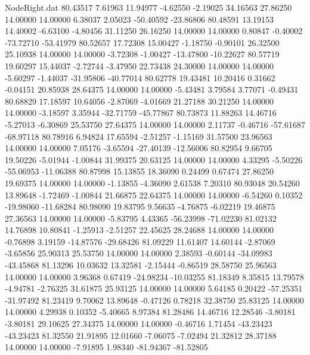 \begin{filecontents}{NodeRight.dat}
  80.43517    7.61963   11.94977    -4.62550   -2.19025   34.16563   27.86250   14.00000   14.00000    6.38037    2.05023  -50.40592  -23.86806
  80.48591   13.19153   14.40002    -6.63100   -4.80456   31.11250   26.16250   14.00000   14.00000    0.80847   -0.40002  -73.72710  -53.41979
  80.52657   17.72308   15.00427    -1.18750   -0.90101   26.32500   25.10938   14.00000   14.00000   -3.72308   -1.00427  -13.47800  -10.22627
  80.57719   19.60297   15.44037    -2.72744   -3.47950   22.73438   24.30000   14.00000   14.00000   -5.60297   -1.44037  -31.95806  -40.77014
  80.62778   19.43481   10.20416     0.31662   -0.04151   20.85938   28.64375   14.00000   14.00000   -5.43481    3.79584    3.77071   -0.49431
  80.68829   17.18597   10.64056    -2.87069   -4.01669   21.27188   30.21250   14.00000   14.00000   -3.18597    3.35944  -32.71759  -45.77867
  80.73873   11.88263   14.46716    -5.27013   -6.30869   25.53750   27.64375   14.00000   14.00000    2.11737   -0.46716  -57.61687  -68.97118
  80.78916    6.94824   17.65594    -2.51257   -1.15169   31.57500   23.96563   14.00000   14.00000    7.05176   -3.65594  -27.40139  -12.56006
  80.82954    9.66705   19.50226    -5.01944   -1.00844   31.99375   20.63125   14.00000   14.00000    4.33295   -5.50226  -55.06953  -11.06388
  80.87998   15.13855   18.36090     0.24499    0.67474   27.86250   19.69375   14.00000   14.00000   -1.13855   -4.36090    2.61538    7.20310
  80.93048   20.54260   13.89648    -1.72469   -1.00844   21.66875   22.64375   14.00000   14.00000   -6.54260    0.10352  -19.98060  -11.68284
  80.98090   19.83795    9.56635    -4.76875   -6.02219   19.46875   27.36563   14.00000   14.00000   -5.83795    4.43365  -56.23998  -71.02230
  81.02132   14.76898   10.80841    -1.25913   -2.51257   22.45625   28.24688   14.00000   14.00000   -0.76898    3.19159  -14.87576  -29.68426
  81.09229   11.61407   14.60144    -2.87069   -3.65856   25.90313   25.53750   14.00000   14.00000    2.38593   -0.60144  -34.09983  -43.45868
  81.13296   10.03632   13.32581    -2.15444   -0.86519   28.58750   25.96563   14.00000   14.00000    3.96368    0.67419  -24.98234  -10.03255
  81.18349    8.35815   13.79578    -4.94781   -2.76325   31.61875   25.93125   14.00000   14.00000    5.64185    0.20422  -57.25351  -31.97492
  81.23419    9.70062   13.89648    -0.47126    0.78218   32.38750   25.83125   14.00000   14.00000    4.29938    0.10352   -5.40665    8.97384
  81.28486   14.46716   12.28546    -3.80181   -3.80181   29.10625   27.34375   14.00000   14.00000   -0.46716    1.71454  -43.23423  -43.23423
  81.32550   21.91895   12.01660    -7.06075   -7.02494   21.32812   28.37188   14.00000   14.00000   -7.91895    1.98340  -81.94367  -81.52805

\end{filecontents}
